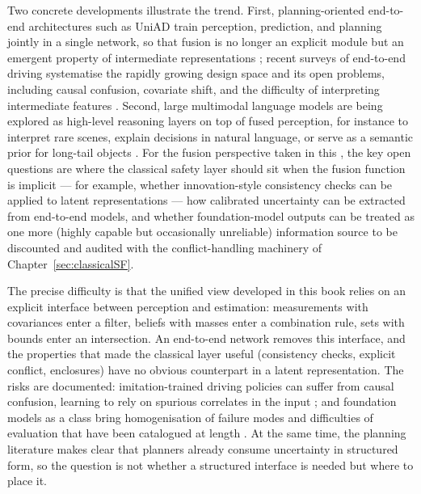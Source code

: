 Two concrete developments illustrate the trend. First, planning-oriented end-to-end architectures such as UniAD train perception, prediction, and planning jointly in a single network, so that fusion is no longer an explicit module but an emergent property of intermediate representations \cite{hu2023_uniad}; recent surveys of end-to-end driving systematise the rapidly growing design space and its open problems, including causal confusion, covariate shift, and the difficulty of interpreting intermediate features \cite{chen2024_e2e_survey}. Second, large multimodal language models are being explored as high-level reasoning layers on top of fused perception, for instance to interpret rare scenes, explain decisions in natural language, or serve as a semantic prior for long-tail objects \cite{cui2024_mllm_driving}. For the fusion perspective taken in this , the key open questions are where the classical safety layer should sit when the fusion function is implicit --- for example, whether innovation-style consistency checks can be applied to latent representations --- how calibrated uncertainty can be extracted from end-to-end models, and whether foundation-model outputs can be treated as one more (highly capable but occasionally unreliable) information source to be discounted and audited with the conflict-handling machinery of Chapter~\ref{sec:classicalSF}.

The precise difficulty is that the unified view developed in this book relies on an explicit interface between perception and estimation: measurements with covariances enter a filter, beliefs with masses enter a combination rule, sets with bounds enter an intersection. An end-to-end network removes this interface, and the properties that made the classical layer useful (consistency checks, explicit conflict, enclosures) have no obvious counterpart in a latent representation. The risks are documented: imitation-trained driving policies can suffer from causal confusion, learning to rely on spurious correlates in the input \cite{dehaan2019_causal_confusion}; and foundation models as a class bring homogenisation of failure modes and difficulties of evaluation that have been catalogued at length \cite{bommasani2021_foundation}. At the same time, the planning literature \cite{schwarting2018_planning} makes clear that planners already consume uncertainty in structured form, so the question is not whether a structured interface is needed but where to place it.


